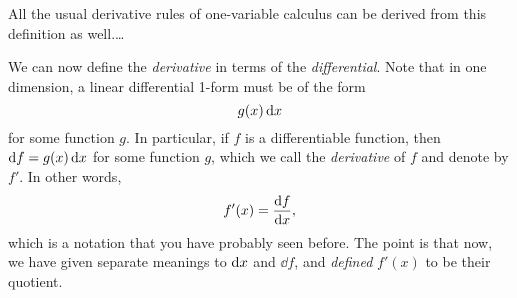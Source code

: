 \documentclass[12pt]{amsart}
\begin{document}
All the usual derivative rules of one-variable calculus can be derived from this definition as well.\dots

We can now define the \emph{derivative} in terms of the \emph{differential}.
Note that in one dimension, a linear differential 1-form must be of the form
\[ g(x) \,\mathrm{d} x \]
for some function $g$.
In particular, if $f$ is a differentiable function, then $\mathrm{d} f = g(x) \, \mathrm{d} x$ for some function $g$, which we call the \emph{derivative} of $f$ and denote by $f'$.
In other words,
\[ f'(x) = \frac{\mathrm{d} f}{\mathrm{d} x}, \]
which is a notation that you have probably seen before.
The point is that now, we have given separate meanings to $\mathrm{d} x$ and $\dd f$, and \emph{defined} $f'(x)$ to be their quotient.
\end{document}
